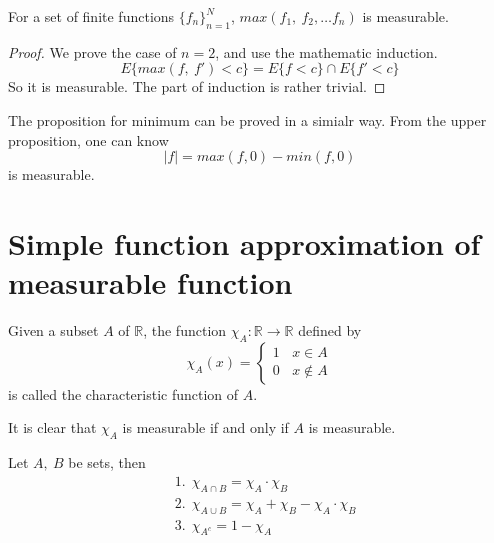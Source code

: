 \documentclass[lang=en, 12pt]{elegantbook}
\newcommand{\RR}{\mathbb{R}}
\begin{document}
            \begin{proposition}
                For a set of finite functions $\{f_n\}_{n=1}^{N}$, $max(f_1, \ f_2, \dots f_n)$ is measurable. 
            \end{proposition} 
            \begin{proof}
                We prove the case of $n=2$, and use the mathematic induction. 
                $$E\{max(f, \ f')< c \} = E\{f< c \} \cap E\{f'< c \}$$
                So it is measurable. The part of induction is rather trivial.
            \end{proof}
                The proposition for minimum can be proved in a simialr way. From the upper proposition, one can know 
                $$|f| = max(f, 0) - min(f,0)$$
                is measurable.

        \section{Simple function approximation of measurable function}
                \begin{definition}
                    Given a subset $A$ of $\RR$, the function $\chi_A: \RR \to \RR$ defined by 
                    \begin{equation*}
                        \chi_A(x) = \left\{ \begin{matrix}
                            1  \ \ \ \ x \in A\\
                            0  \ \ \ \ x \notin A
                        \end{matrix} \right.
                    \end{equation*}
                    is called the characteristic function of $A$.
                \end{definition}
                It is clear that $\chi_A$ is measurable if and only if $A$ is measurable.
                \begin{proposition}
                    Let $A, \ B$ be sets, then 
                    \begin{equation*}
                        \begin{aligned}
                            &1. \ \ \chi_{A \cap B} = \chi_A \cdot \chi_B \\
                            &2.  \ \ \chi_{A \cup B} = \chi_A + \chi_B - \chi_A \cdot \chi_B\\
                            &3. \ \ \chi_{A^c} = 1 - \chi_A 
                        \end{aligned}
                    \end{equation*}\par
                \end{proposition}
\end{document}
